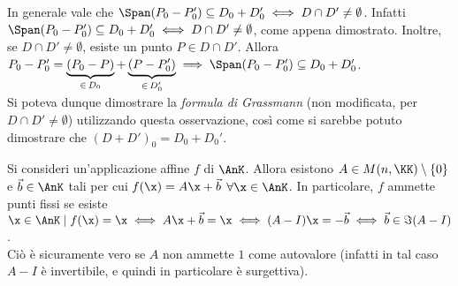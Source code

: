 \documentclass[11pt]{article}
\begin{document}
	\begin{remark}
		In generale vale che $\Span(P_0 - P_0') \subseteq D_0 + D_0' \iff
		D \cap D' \neq \emptyset$. Infatti $\Span(P_0 - P_0') \subseteq D_0 + D_0' \iff D \cap D' \neq \emptyset$, come appena dimostrato.
		Inoltre, se $D \cap D' \neq \emptyset$, esiste un punto
		$P \in D \cap D'$. Allora $P_0 - P_0' = \underbrace{(P_0 - P)}_{\in \, D_0} + \underbrace{(P - P_0')}_{\in \, D_0'} \implies \Span(P_0 - P_0') \subseteq D_0 + D_0'$. \\
		
		Si poteva dunque dimostrare la \textit{formula di Grassmann} (non
		modificata, per $D \cap D' \neq \emptyset$) utilizzando questa osservazione, così come si sarebbe
		potuto dimostrare che $(D + D')_0 = D_0 + D_0'$.
	\end{remark}
	
	\hr
	
	\begin{remark} 
		Si consideri un'applicazione affine $f$ di $\AnK$. Allora esistono $A \in M(n, \KK) \setminus \{0\}$ e $\vec b \in \AnK$ tali
		per cui $f(\x) = A \x + \vec b$ $\forall \x \in \AnK$. In particolare, $f$ ammette punti fissi se
		esiste $\x \in \AnK \mid f(\x) = \x \iff A \x + \vec b = \x \iff (A-I) \x = -\vec b \iff \vec b \in \Im(A-I)$. \\
		
		Ciò è sicuramente vero se $A$ non ammette $1$ come autovalore (infatti in tal caso $A-I$ è invertibile, e quindi
		in particolare è surgettiva). 
	\end{remark}
	
\end{document}
